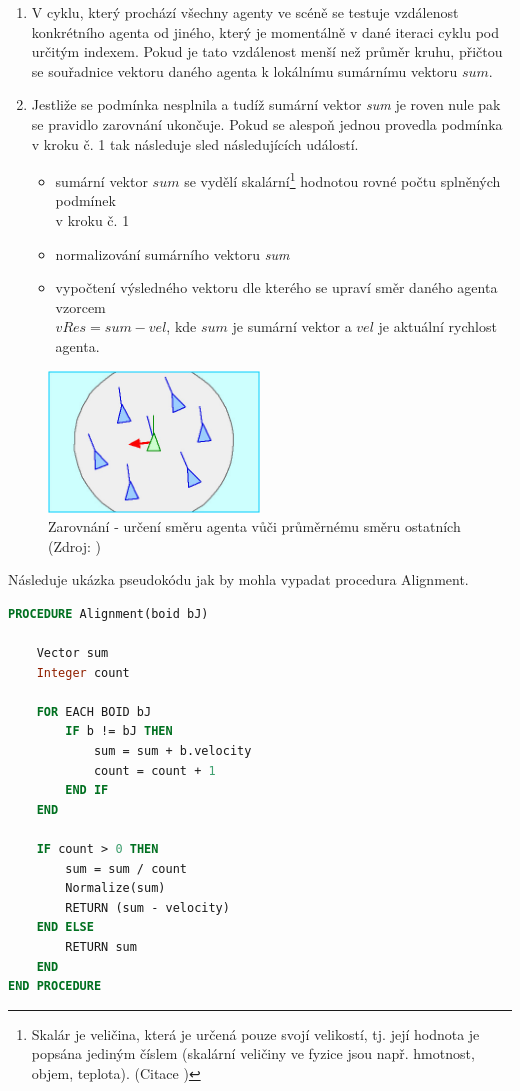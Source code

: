 \documentclass[czech,public,dept460,male,cpdeclaration]{diploma}
\begin{document}
\begin{enumerate}
	\item V cyklu, který prochází všechny agenty ve scéně se testuje vzdálenost konkrétního agenta od jiného, který je momentálně v dané iteraci cyklu pod určitým indexem. Pokud je tato vzdálenost menší než průměr kruhu, přičtou se souřadnice vektoru daného agenta k lokálnímu sumárnímu vektoru \(sum\).
	\item Jestliže se podmínka nesplnila a tudíž sumární vektor \textit{sum} je roven nule pak se pravidlo zarovnání ukončuje. Pokud se alespoň jednou provedla podmínka v kroku č. 1 tak následuje sled následujících událostí.
	
	\begin{itemize}
		\item sumární vektor \(sum\) se vydělí skalární\footnote{Skalár je veličina, která je určená pouze svojí velikostí, tj. její hodnota je popsána jediným číslem (skalární veličiny ve fyzice jsou např. hmotnost, objem, teplota).
		(Citace \cite{linkToScalar})} hodnotou rovné počtu splněných podmínek \\v kroku č. 1
		\item normalizování sumárního vektoru \textit{sum}
		\item vypočtení výsledného vektoru dle kterého se upraví směr daného agenta vzorcem \\\(vRes = sum - vel\), kde \(sum\) je sumární vektor a \(vel\) je aktuální rychlost agenta.
	\end{itemize}
	
\end{enumerate}

\begin{figure}[H]\centering\includegraphics[width=0.5\textwidth]{Figures/alignment.jpg}
	\caption{Zarovnání - určení směru agenta vůči průměrnému směru ostatních (Zdroj: \cite{link2})}
\end{figure}

Následuje ukázka pseudokódu jak by mohla vypadat procedura Alignment.

\begin{lstlisting}[language=pascal,label=src:Alignment pseudocode,caption=Pseudokód pro zarovnání]
PROCEDURE Alignment(boid bJ)

	Vector sum
	Integer count
	
	FOR EACH BOID bJ
		IF b != bJ THEN
			sum = sum + b.velocity
			count = count + 1
		END IF
	END
	
	IF count > 0 THEN
		sum = sum / count
		Normalize(sum)
		RETURN (sum - velocity)
	END ELSE
		RETURN sum
	END
END PROCEDURE
\end{lstlisting}
\end{document}
